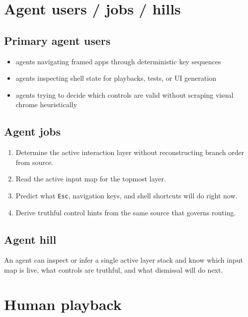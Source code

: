 \section{Agent users / jobs / hills}\label{record-254-agent-users-jobs-hills}

\subsection{Primary agent users}\label{record-254-primary-agent-users}

\begin{itemize}
\tightlist
\item
  agents navigating framed apps through deterministic key sequences
\item
  agents inspecting shell state for playbacks, tests, or UI generation
\item
  agents trying to decide which controls are valid without scraping visual chrome heuristically
\end{itemize}

\subsection{Agent jobs}\label{record-254-agent-jobs}

\begin{enumerate}
\def\labelenumi{\arabic{enumi}.}
\tightlist
\item
  Determine the active interaction layer without reconstructing branch order from source.
\item
  Read the active input map for the topmost layer.
\item
  Predict what \texttt{E\allowbreak{}s\allowbreak{}c}, navigation keys, and shell shortcuts will do right now.
\item
  Derive truthful control hints from the same source that governs routing.
\end{enumerate}

\subsection{Agent hill}\label{record-254-agent-hill}

An agent can inspect or infer a single active layer stack and know which input map is live, what controls are truthful, and what dismissal will do next.

\section{Human playback}\label{record-254-human-playback}

